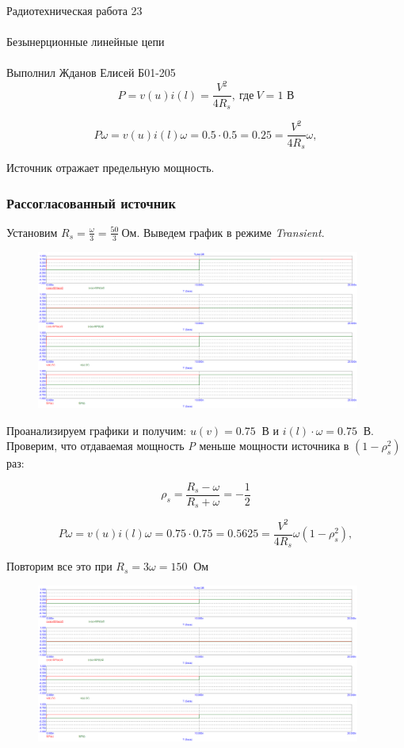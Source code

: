 \documentclass{astroedu-lab}
\begin{document}
\begin{problem}{\huge Радиотехническая работа 23\\\\Безынерционные линейные цепи\\\\Выполнил Жданов Елисей Б01-205}
\[P = v(u)i(l) = \frac{V^2}{4R_s}, \: \text{где} \: V = 1\textit{ В}\]

\[P\omega = v(u)i(l)\omega = 0.5\cdot 0.5 = 0.25 = \frac{V^2}{4R_s} \omega,\]

Источник отражает предельную мощность.

\subsubsection{Рассогласованный источник}

Установим $R_s = \frac{\omega}{3} = \frac{50}{3} \: \textit{Ом}$. Выведем график в режиме \textit{Transient}.

\begin{figure}[h!]
\centering
\includegraphics[width=0.95\textwidth]{картинки/Graph2.png}
\label{fig:Image1}
\end{figure}

Проанализируем графики и получим: $u(v) = 0.75 \: \textit{ В}$ и $i(l)\cdot \omega = 0.75 \: \textit{ В}$. Проверим, что отдаваемая мощность \textit{P} меньше мощности источника в $(1 - \rho_s^2)$ раз:

\[\rho_s = \frac{R_s - \omega}{R_s + \omega} = -\frac{1}{2}\]

\[P\omega = v(u)i(l)\omega = 0.75 \cdot 0.75 = 0.5625 = \frac{V^2}{4R_s} \omega (1 - \rho_s^2),\]

Повторим все это при $R_s = 3\omega = 150 \: \textit{ Ом}$

\begin{figure}[h!]
\centering
\includegraphics[width=0.95\textwidth]{картинки/Graph3.png}
\label{fig:Image1}
\end{figure}


\end{problem}
\end{document}
